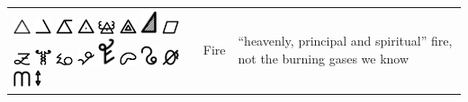 \documentclass[british,final,landscape]{scrartcl}
\begin{document}
\begin{refsection}
\begin{supertabular}{p{0.3\textwidth}p{0.34\textwidth}p{0.34\textwidth}}
  \includegraphics[width=5mm]{Concepts/Fire} \includegraphics[width=5mm]{Concepts/Fire2} \includegraphics[width=5mm]{Concepts/Fire8} \includegraphics[width=5mm]{Concepts/Fire9} \includegraphics[width=5mm]{Concepts/Fire12} \includegraphics[width=5mm]{Concepts/Fire16} \includegraphics[width=5mm]{Concepts/Fire17} \includegraphics[width=5mm]{Concepts/Fire10} \includegraphics[width=5mm]{Concepts/Fire3} \includegraphics[width=5mm]{Concepts/Fire4} \includegraphics[width=5mm]{Concepts/Fire5} \includegraphics[width=5mm]{Concepts/Fire6} \includegraphics[width=5mm]{Concepts/Fire7} \includegraphics[width=5mm]{Concepts/Fire11} \includegraphics[width=5mm]{Concepts/Fire13} \includegraphics[width=5mm]{Concepts/Fire14} \includegraphics[width=5mm]{Concepts/Fire15} \includegraphics[height=5mm]{Concepts/Fire18} & Fire & ``heavenly, principal and spiritual'' fire, not the burning gases we know \\

\end{supertabular}
\end{refsection}
\end{document}
